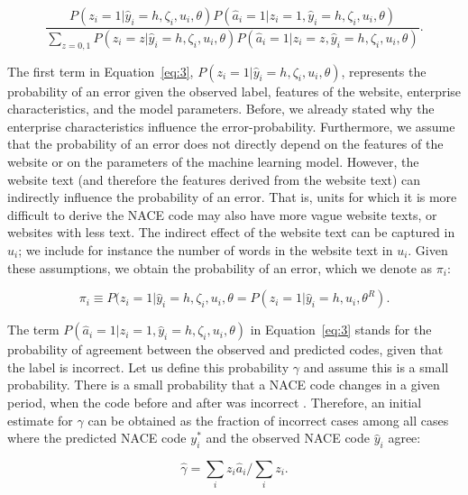 \documentclass[12pt, a4paper, titlepage]{article}
\begin{document}
						\begin{equation}\label{eq:3}
\frac{P(z_i = 1|\hat{y}_i = h, \zeta_i, u_i, \theta)P(\hat{a}_i=1|z_i=1, \hat{y}_i = h, \zeta_i, u_i, \theta) }
{\sum_{z=0,1}P(z_i=z|\hat{y}_i = h, \zeta_i, u_i, \theta) P( \hat{a}_i=1|z_i=z, \hat{y}_i = h, \zeta_i, u_i, \theta  )} .
						\end{equation}


The first term in Equation~\ref{eq:3}, $P(z_i = 1|\hat{y}_i = h, \zeta_i, u_i, \theta)$, represents the probability of an error given the observed label, features of the website, enterprise characteristics, and the model parameters. Before, we already stated why the enterprise characteristics influence the error-probability. Furthermore, we assume that the probability of an error does not directly depend on the features of the website or on the parameters of the machine learning model. However, the website text (and therefore the features derived from the website text) can indirectly influence the probability of an error. That is, units for which it is more difficult to derive the NACE code may also have more vague website texts, or websites with less text. The indirect effect of the website text can be captured in $u_i$; we include for instance the number of words in the website text in $u_i$. Given these assumptions, we obtain the probability of an error, which we denote as $\pi_i$:

						\begin{equation}\label{eq:pi4}
\pi_i \equiv P(z_i = 1|\hat{y}_i = h, \zeta_i, u_i, \theta = P(z_i = 1|\hat{y}_i = h, u_i, \theta^R) .
						\end{equation} 

The term $P(\hat{a}_i=1|z_i=1, \hat{y}_i = h, \zeta_i, u_i, \theta)$ in Equation~\ref{eq:3} stands for the probability of agreement between the observed and predicted codes, given that the label is incorrect. Let us define this probability $\gamma$ and assume this is a small probability. There is a small probability that a NACE code changes in a given period, when the code before and after was incorrect \citep{VanDelden}. Therefore, an initial estimate for $\gamma$ can be obtained as the fraction of incorrect cases among all cases where the predicted NACE code $y^*_i$ and the observed NACE code $\hat{y}_i$ agree:

						\begin{equation}\label{eq:gamma5}
\hat{\gamma} = \sum_{i} z_i \hat{a}_i / \sum_{i} z_i.
						\end{equation} 
\end{document}
